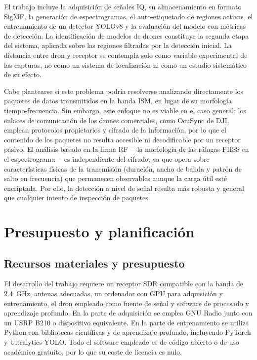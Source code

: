 El trabajo incluye la adquisición de señales IQ, su almacenamiento en formato SigMF, la generación de espectrogramas, el auto-etiquetado de regiones activas, el entrenamiento de un detector YOLOv8 y la evaluación del modelo con métricas de detección. La identificación de modelos de drones constituye la segunda etapa del sistema, aplicada sobre las regiones filtradas por la detección inicial. La distancia entre dron y receptor se contempla solo como variable experimental de las capturas, no como un sistema de localización ni como un estudio sistemático de su efecto.

Cabe plantearse si este problema podría resolverse analizando directamente los paquetes de datos transmitidos en la banda ISM, en lugar de su morfología tiempo-frecuencia. Sin embargo, este enfoque no es viable en el caso general: los enlaces de comunicación de los drones comerciales, como OcuSync de DJI, emplean protocolos propietarios y cifrado de la información, por lo que el contenido de los paquetes no resulta accesible ni decodificable por un receptor pasivo. El análisis basado en la firma RF —la morfología de las ráfagas FHSS en el espectrograma— es independiente del cifrado, ya que opera sobre características físicas de la transmisión (duración, ancho de banda y patrón de salto en frecuencia) que permanecen observables aunque la carga útil esté encriptada. Por ello, la detección a nivel de señal resulta más robusta y general que cualquier intento de inspección de paquetes.

\section{Presupuesto y planificación}
\label{sec:presupuesto_planificacion}

\subsection{Recursos materiales y presupuesto}

El desarrollo del trabajo requiere un receptor SDR compatible con la banda de \SI{2.4}{\giga\hertz}, antenas adecuadas, un ordenador con GPU para adquisición y entrenamiento, el dron empleado como fuente de señal y software de procesado y aprendizaje profundo. En la parte de adquisición se emplea GNU Radio junto con un USRP B210 o dispositivo equivalente. En la parte de entrenamiento se utiliza Python con bibliotecas científicas y de aprendizaje profundo, incluyendo PyTorch y Ultralytics YOLO. Todo el software empleado es de código abierto o de uso académico gratuito, por lo que su coste de licencia es nulo.

